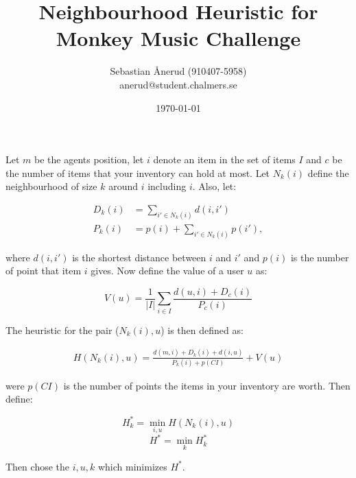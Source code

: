 \documentclass[11pt]{article}
\begin{document}
\title{Neighbourhood Heuristic for Monkey Music Challenge}
\author{Sebastian Ånerud (910407-5958) \\
		anerud@student.chalmers.se}
\date{\today}
\maketitle

\begin{flushleft}

Let $m$ be the agents position, let $i$ denote an item in the set of items $I$ and $c$ be the number of items that your inventory can hold at most. Let $N_k(i)$ define the neighbourhood of size $k$ around $i$ including $i$. Also, let:

\begin{align*}
D_k(i) &= \sum\limits_{i'\in N_k(i)} d(i,i') \\
P_k(i) &= p(i) + \sum\limits_{i'\in N_k(i)} p(i'),
\end{align*}

where $d(i,i')$ is the shortest distance between $i$ and $i'$ and $p(i)$ is the number of point that item $i$ gives. Now define the value of a user $u$ as:

$$V(u) = \frac{1}{|I|} \sum\limits_{i \in I} \frac{d(u,i) + D_c(i)}{P_c(i)}$$

The heuristic for the pair ($N_k(i), u$) is then defined as:

\begin{align*}
H(N_k(i),u) = \frac{d(m,i) + D_k(i) + d(i,u)}{P_k(i) + p(CI)} + V(u)
\end{align*}

were $p(CI)$ is the number of points the items in your inventory are worth. Then define:

$$H_k^* = \min\limits_{i,u} H(N_k(i),u)$$
$$H^* = \min\limits_{k} H_k^*$$

Then chose the $i,u,k$ which minimizes $H^*$.
\end{flushleft}
\end{document}
